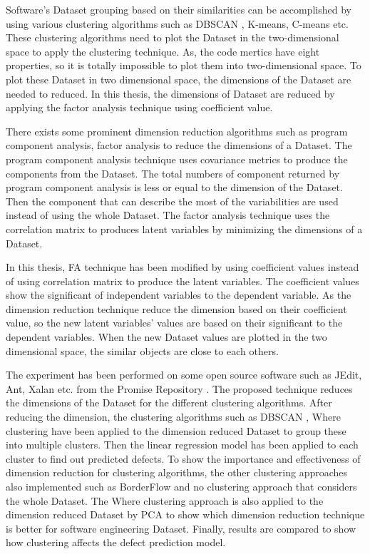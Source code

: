 \documentclass[12pt]{report}
\begin{document}
Software's Dataset grouping based on their similarities can be accomplished by using various clustering algorithms such as DBSCAN \cite{ester1996density}, K-means, C-means etc. These clustering algorithms need to plot the Dataset in the two-dimensional space to apply the clustering technique. As, the code mertics have eight properties, so it is totally impossible to plot them into two-dimensional space. To plot these Dataset in two dimensional space, the dimensions of the Dataset are needed to reduced. In this thesis, the dimensions of Dataset are reduced by applying the factor analysis technique using coefficient value.

There exists some prominent dimension reduction algorithms such as program component analysis, factor analysis to reduce the dimensions of a Dataset. The program component analysis technique uses covariance metrics to produce the components from the Dataset. The total numbers of component returned by program component analysis is less or equal to the dimension of the Dataset. Then the component that can describe the most of the variabilities are used instead of using the whole Dataset. The factor analysis technique uses the correlation matrix to produces latent variables by minimizing the dimensions of a Dataset.      


In this thesis, FA technique has been modified by using coefficient values instead of using correlation matrix to produce the latent variables. The coefficient values show the significant of independent variables to the dependent variable. As the dimension reduction technique reduce the dimension based on their coefficient value, so the new latent variables' values are based on their significant to the dependent variables. When the new Dataset values are plotted in the two dimensional space, the similar objects are close to each others. 

The experiment has been performed on some open source software such as JEdit, Ant, Xalan etc. from the Promise Repository \cite{promise12}. The proposed technique reduces the dimensions of the Dataset for the different clustering algorithms. After reducing the dimension, the clustering algorithms such as DBSCAN \cite{ester1996density}, Where clustering \cite{menzies2011local,menzies2013local} have been applied to the dimension reduced Dataset to group these into multiple clusters. Then the linear regression model has been applied to each cluster to find out predicted defects. To show the importance and effectiveness of dimension reduction for clustering algorithms, the other clustering approaches also implemented such as BorderFlow and no clustering approach that considers the whole Dataset. The Where clustering approach \cite{menzies2011local,menzies2013local} is also applied to the dimension reduced Dataset by PCA to show which dimension reduction technique is better for software engineering Dataset. Finally, results are compared to show how clustering affects the defect prediction model.
\end{document}
